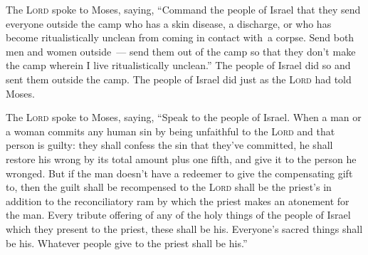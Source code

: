 
\begin{inparaenum}
     The \textsc{Lord} spoke to Moses, saying,%
     ``Command the people of Israel that they send everyone outside the camp who has a skin disease, a discharge, or who has become ritualistically unclean from coming in contact with\understood\ a corpse.%
     Send both men and women outside~--- send them out of the camp so that they don't make the camp wherein I live ritualistically unclean.''%
     The people of Israel did so and sent them outside the camp. The people of Israel did just as the \textsc{Lord} had told Moses.%
    
     The \textsc{Lord} spoke to Moses, saying,%
     ``Speak to the people of Israel. When a man or a woman commits any human sin by being unfaithful to the \textsc{Lord} and that person is guilty:%
     they shall confess the sin that they've committed, he shall restore his wrong by its total amount plus one fifth, and give it to the person he wronged.%
     But if the man doesn't have a redeemer to give the compensating gift to, then the guilt shall be recompensed to the \textsc{Lord} shall be the priest's in addition to the reconciliatory ram by which the priest makes an atonement for the man.%
     Every tribute offering of any of the holy things of the people of Israel which they present to the priest, these shall be his.%
     Everyone's sacred things shall be his. Whatever people give to the priest shall be his.''%
    

\end{inparaenum}
